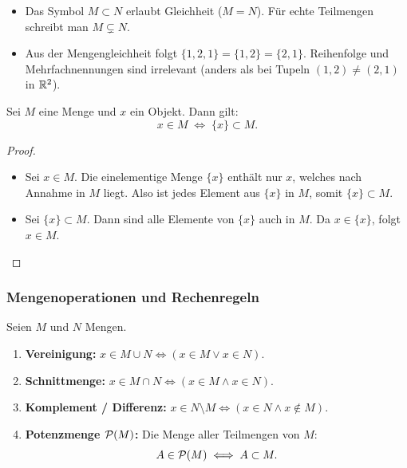 \begin{bemerkung}
\begin{itemize}
    \item Das Symbol $M \subset N$ erlaubt Gleichheit ($M = N$). Für echte Teilmengen schreibt man $M \subsetneq N$.
    \item Aus der Mengengleichheit folgt $\{1, 2, 1\} = \{1, 2\} = \{2, 1\}$. Reihenfolge und Mehrfachnennungen sind irrelevant (anders als bei Tupeln $(1, 2) \ne (2, 1)$ in $\mathbb{R}^2$).
\end{itemize}
\end{bemerkung}

\begin{satz}
Sei $M$ eine Menge und $x$ ein Objekt. Dann gilt:
\[
x \in M \;\Longleftrightarrow\; \{x\} \subset M.
\]
\end{satz}

\begin{proof}
\begin{itemize}
    \item[$\Rightarrow$:] Sei $x \in M$. Die einelementige Menge $\{x\}$ enthält nur $x$, welches nach Annahme in $M$ liegt. Also ist jedes Element aus $\{x\}$ in $M$, somit $\{x\} \subset M$.
    \item[$\Leftarrow$:] Sei $\{x\} \subset M$. Dann sind alle Elemente von $\{x\}$ auch in $M$. Da $x \in \{x\}$, folgt $x \in M$.
\end{itemize}
\end{proof}

\subsubsection*{Mengenoperationen und Rechenregeln}

\begin{definition}
Seien $M$ und $N$ Mengen.
\begin{enumerate}
    \item \textbf{Vereinigung:} $x \in M \cup N \Longleftrightarrow (x \in M \lor x \in N)$.
    \item \textbf{Schnittmenge:} $x \in M \cap N \Longleftrightarrow (x \in M \land x \in N)$.
    \item \textbf{Komplement / Differenz:} $x \in N \setminus M \Longleftrightarrow (x \in N \land x \notin M)$.
    \item \textbf{Potenzmenge $\mathcal{P}(M)$:} Die Menge aller Teilmengen von $M$:
    \[
    A \in \mathcal{P}(M) \;\Longleftrightarrow\; A \subset M.
    \]
\end{enumerate}
\end{definition}

